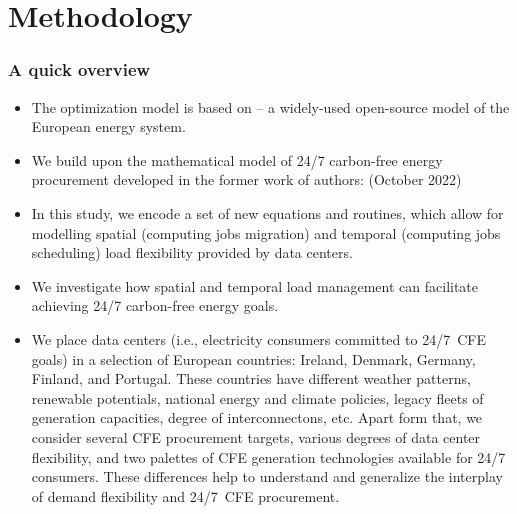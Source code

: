
\section{Methodology}


\begin{frame}
  \frametitle{A quick overview}

{\footnotesize
  \begin{itemize}
    
    \item The optimization model is based on  -- a widely-used open-source model of the European energy system.

    \item We build upon the mathematical model of 24/7 carbon-free energy procurement developed in the former work of authors:  (October 2022)
    
    \item In this study, we encode a set of new equations and routines, which allow for modelling spatial (computing jobs migration) and temporal (computing jobs scheduling) load flexibility provided by data centers.

    \item We investigate how spatial and temporal load management can facilitate achieving 24/7 carbon-free energy goals.

    \item We place data centers (i.e., electricity consumers committed to 24/7~CFE goals) in a 
    selection of European countries: Ireland, Denmark, Germany, Finland, and Portugal. These countries have different weather patterns, renewable potentials, national energy and climate policies, legacy fleets of generation capacities, degree of interconnectons, etc. 
    Apart form that, we consider several CFE procurement targets, various degrees of data center flexibility, and two palettes of CFE generation technologies available for 24/7 consumers. These differences help to understand and generalize the interplay of demand flexibility and 24/7~CFE procurement.

  \end{itemize}
}

\end{frame}


